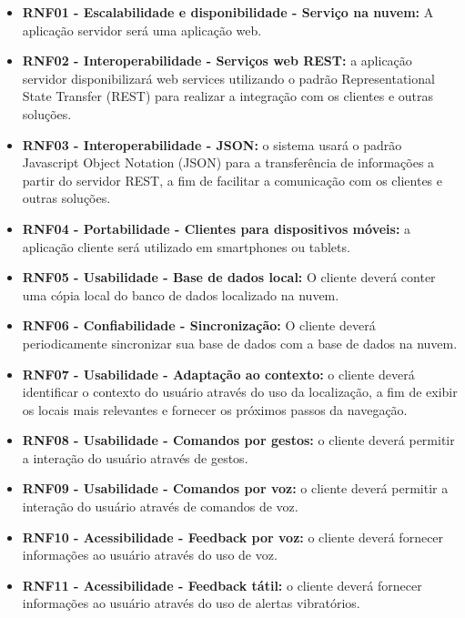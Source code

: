 \documentclass[twoside,english,brazilian]{UNISINOSartigo}
\begin{document}
 \begin{itemize}
 	\item \textbf{RNF01 - Escalabilidade e disponibilidade - Serviço na nuvem:} A aplicação servidor será uma aplicação web.

 	\item \textbf{RNF02 - Interoperabilidade - Serviços web REST:} a aplicação servidor disponibilizará web services utilizando o padrão Representational State Transfer (REST) para realizar a integração com os clientes e outras soluções.

 	\item \textbf{RNF03 - Interoperabilidade - JSON:} o sistema usará o padrão Javascript Object Notation (JSON) para a transferência de informações a partir do servidor REST, a fim de facilitar a comunicação com os clientes e outras soluções.

 	\item \textbf{RNF04 - Portabilidade - Clientes para dispositivos móveis:} a aplicação cliente será utilizado em smartphones ou tablets.

 	\item \textbf{RNF05 - Usabilidade - Base de dados local:} O cliente deverá conter uma cópia local do banco de dados localizado na nuvem.

 	\item \textbf{RNF06 - Confiabilidade - Sincronização:} O cliente deverá periodicamente sincronizar sua base de dados com a base de dados na nuvem.

 	\item \textbf{RNF07 - Usabilidade - Adaptação ao contexto:} o cliente deverá identificar o contexto do usuário através do uso da localização, a fim de exibir os locais mais relevantes e fornecer os próximos passos da navegação.

 	\item \textbf{RNF08 - Usabilidade - Comandos por gestos:} o cliente deverá permitir a interação do usuário através de gestos.

 	\item \textbf{RNF09 - Usabilidade - Comandos por voz:} o cliente deverá permitir a interação do usuário através de comandos de voz.

 	\item \textbf{RNF10 - Acessibilidade - Feedback por voz:} o cliente deverá fornecer informações ao usuário através do uso de voz.

 	\item \textbf{RNF11 - Acessibilidade - Feedback tátil:} o cliente deverá fornecer informações ao usuário através do uso de alertas vibratórios.


\end{itemize}
\end{document}
